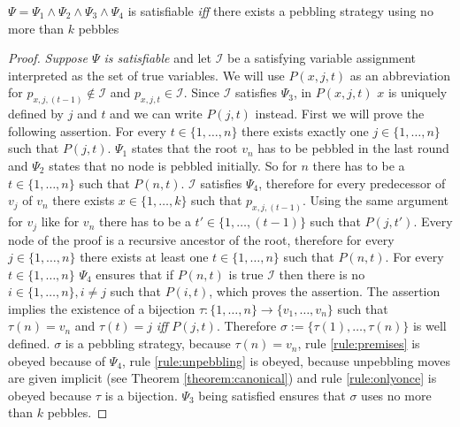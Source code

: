 \begin{theorem}

$\Psi = \Psi_1 \wedge \Psi_2 \wedge \Psi_3 \wedge \Psi_4$ is satisfiable \emph{iff} there exists a pebbling strategy using no more than $k$ pebbles

\end{theorem}

\begin{proof}

\emph{Suppose $\Psi$ is satisfiable} and let $\mathcal{I}$ be a satisfying variable assignment interpreted as the set of true variables.
We will use $P(x,j,t)$ as an abbreviation for $p_{x,j,(t-1)} \notin \mathcal{I}$ and $p_{x,j,t} \in \mathcal{I}$.
Since $\mathcal{I}$ satisfies $\Psi_3$, in $P(x,j,t)$ $x$ is uniquely defined by $j$ and $t$ and we can write $P(j,t)$ instead.
First we will prove the following assertion.
For every $t \in \{1,\ldots,n\}$ there exists exactly one $j \in \{1,\ldots,n\}$ such that $P(j,t)$.
$\Psi_1$ states that the root $v_n$ has to be pebbled in the last round and $\Psi_2$ states that no node is pebbled initially.
So for $n$ there has to be a $t \in \{1,\ldots,n\}$ such that $P(n,t)$.
$\mathcal{I}$ satisfies $\Psi_4$, therefore for every predecessor of $v_j$ of $v_n$ there exists $x \in \{1,\ldots,k\}$ such that $p_{x,j,(t-1)}$.
Using the same argument for $v_j$ like for $v_n$ there has to be a $t' \in \{1,\ldots,(t-1)\}$ such that $P(j,t')$.
Every node of the proof is a recursive ancestor of the root, therefore for every $j \in \{1,\ldots,n\}$ there exists at least one $t \in \{1,\ldots,n\}$ such that $P(n,t)$.
For every $t \in \{1,\ldots,n\}$ $\Psi_4$ ensures that if $P(n,t)$ is true $\mathcal{I}$ then there is no $i \in \{1,\ldots,n\}, i \neq j$ such that $P(i,t)$, which proves the assertion.
The assertion implies the existence of a bijection $\tau : \{1,\ldots,n\} \rightarrow \{v_1,\ldots,v_n\}$ such that $\tau(n) = v_n$ and $\tau(t) = j$ \emph{iff} $P(j,t)$.
Therefore $\sigma := \{\tau(1),\ldots,\tau(n)\}$ is well defined.
$\sigma$ is a pebbling strategy, because $\tau(n) = v_n$, rule \ref{rule:premises} is obeyed because of $\Psi_4$, rule \ref{rule:unpebbling} is obeyed, because unpebbling moves are given implicit (see Theorem \ref{theorem:canonical}) and rule \ref{rule:onlyonce} is obeyed because $\tau$ is a bijection.
$\Psi_3$ being satisfied ensures that $\sigma$ uses no more than $k$ pebbles.


\end{proof}
